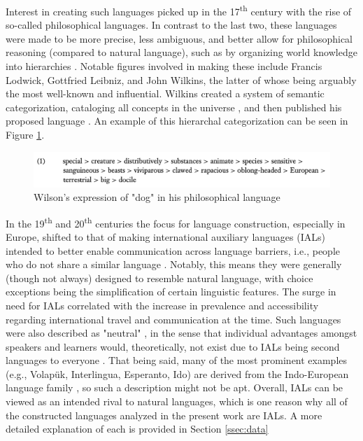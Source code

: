 \documentclass[12pt,a4paper]{article}
\numberwithin{figure}{section}
\numberwithin{table}{section}
\numberwithin{definition}{section}
\begin{document}
Interest in creating such languages picked up in the 17\textsuperscript{th} century with the rise of so-called philosophical languages. In contrast to the last two, these languages were made to be more precise, less ambiguous, and better allow for philosophical reasoning (compared to natural language), such as by organizing world knowledge into hierarchies \parencite{goodall2022article}. Notable figures involved in making these include Francis Lodwick, Gottfried Leibniz, and John Wilkins, the latter of whose being arguably the most well-known and influential. Wilkins created a system of semantic categorization, cataloging all concepts in the universe \parencite{okrent2009book}, and then published his proposed language \parencite{Wilkins1968book}. An example of this hierarchal categorization can be seen in Figure \ref{fig:wilsonslanguageexample}.


\begin{figure}
  \centering
        \includegraphics[width=1.0\textwidth]{WilsonsLanguageExample.png}
        \caption{Wilson's expression of "dog" in his philosophical language \parencite{goodall2022article}}
        \label{fig:wilsonslanguageexample}
\end{figure}


In the 19\textsuperscript{th} and 20\textsuperscript{th} centuries the focus for language construction, especially in Europe, shifted to that of making international auxiliary languages (IALs) intended to better enable communication across language barriers, i.e., people who do not share a similar language \parencite{goodall2022article}. Notably, this means they were generally (though not always) designed to resemble natural language, with choice exceptions being the simplification of certain linguistic features. The surge in need for IALs correlated with the increase in prevalence and accessibility regarding international travel and communication at the time. Such languages were also described as "neutral" \parencite{Large1985book}, in the sense that individual advantages amongst speakers and learners would, theoretically, not exist due to IALs being second languages to everyone \parencite{Gobbo2016article}. That being said, many of the most prominent examples (e.g., Volapük, Interlingua, Esperanto, Ido) are derived from the Indo-European language family \parencite{Novikov2022article,goodall2022article}, so such a description might not be apt. Overall, IALs can be viewed as an intended rival to natural languages, which is one reason why all of the constructed languages analyzed in the present work are IALs. A more detailed explanation of each is provided in Section \ref{ssec:data}
\end{document}
